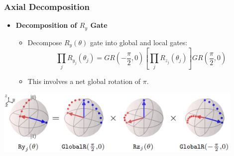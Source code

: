 \documentclass[18 pt]{beamer}
\begin{document}
\begin{frame}
    \frametitle{Axial Decomposition}
    \begin{itemize}
        \item \textbf{Decomposition of $R_y$ Gate}
        \begin{itemize}
            \item Decompose $R_y(\theta)$ gate into global and local gates:
            \[
            \prod_j R_{y_j}(\theta_j) = GR\left(-\frac{\pi}{2}, 0\right) \left[\prod_j R_{z_j}(\theta_j)\right] GR\left(\frac{\pi}{2}, 0\right)
            \]
            \item This involves a net global rotation of $\pi$.
        \end{itemize}
    \end{itemize}
    \begin{center}
        \includegraphics[width=0.9\textwidth]{axial_.png}
    \end{center}
\end{frame}
\end{document}
